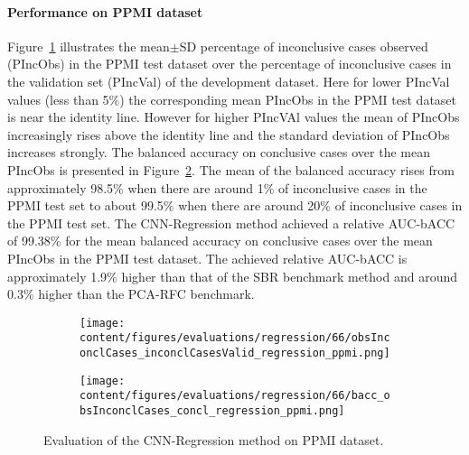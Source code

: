 
\paragraph{Performance on PPMI dataset}

Figure~\ref{fig:obsInconclCases_inconclCasesValid_regression_ppmi} illustrates the
mean$\pm$SD percentage of inconclusive cases observed (PIncObs) in the PPMI test dataset 
over the percentage of inconclusive cases in the validation set (PIncVal) of the development dataset.
Here for lower PIncVal values (less than 5\%) the corresponding mean PIncObs 
in the PPMI test dataset is near the identity line.
However for higher PIncVAl values the mean of PIncObs increasingly rises above the identity line
and the standard deviation of PIncObs increases strongly.
The balanced accuracy on conclusive cases over the mean PIncObs is presented in Figure~\ref{fig:bacc_obsInconclCases_concl_regression_ppmi}.
The mean of the balanced accuracy rises from approximately 98.5\% 
when there are around 1\% of inconclusive cases in the PPMI test set to about 99.5\% 
when there are around 20\% of inconclusive cases in the PPMI test set.
The CNN-Regression method achieved a relative AUC-bACC of 99.38\% for the mean balanced accuracy on conclusive cases 
over the mean PIncObs in the PPMI test dataset.
The achieved relative AUC-bACC is approximately 1.9\% higher than that of the SBR benchmark method 
and around 0.3\% higher than the PCA-RFC benchmark.


\begin{figure}[ht]
  \begin{subfigure}{0.49\textwidth}
    \centering
    \texttt{[image: content/figures/evaluations/regression/66/obsInconclCases\_inconclCasesValid\_regression\_ppmi.png]}
    \label{fig:obsInconclCases_inconclCasesValid_regression_ppmi}
  \end{subfigure}
  \hfill
  \begin{subfigure}{0.49\textwidth}
    \centering
    \texttt{[image: content/figures/evaluations/regression/66/bacc\_obsInconclCases\_concl\_regression\_ppmi.png]}
    \label{fig:bacc_obsInconclCases_concl_regression_ppmi}
  \end{subfigure}
  \caption{Evaluation of the CNN-Regression method on PPMI dataset.}
  \label{fig:perf_regression_ppmi}
\end{figure}



